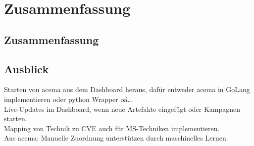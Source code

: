 \chapter{Zusammenfassung}
\label{chap:zusammenfassung}
\section{Zusammenfassung}
\label{sec:zusammenfassung}
\section{Ausblick}
\label{sec:ausblick}
Starten von \gls{acema} aus dem Dashboard heraus, dafür entweder \gls{acema} in GoLang implementieren oder python Wrapper oä\dots \\
Live-Updates im Dashboard, wenn neue Artefakte eingefügt oder Kampagnen starten. \\
Mapping von Technik zu CVE auch für MS-Techniken implementieren. \\
Aus \gls{acema}: Manuelle Zuordnung unterstützen durch maschinelles Lernen. \\
